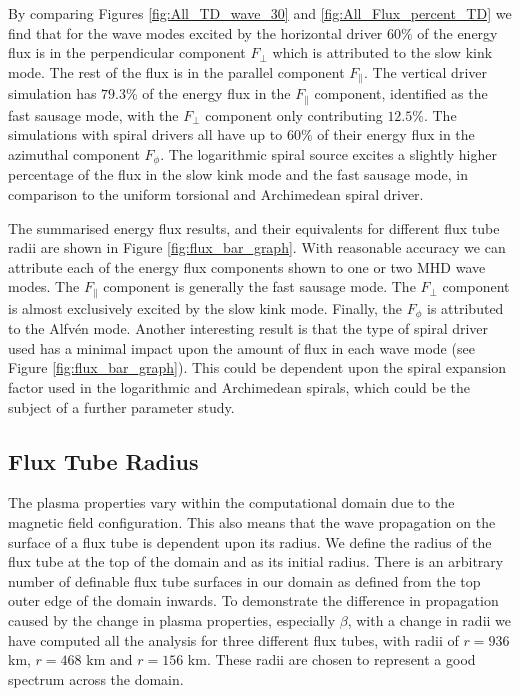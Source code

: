 By comparing Figures \ref{fig:All_TD_wave_30} and \ref{fig:All_Flux_percent_TD} we find that for the wave modes excited by the horizontal driver $60$\% of the energy flux is in the perpendicular component $F_\perp$ which is attributed to the slow kink mode.
 The rest of the flux is in the parallel component $F_\parallel$. 
 The vertical driver simulation has $79.3$\% of the energy flux in the $F_\parallel$ component, identified as the fast sausage mode, with the $F_\perp$ component only contributing $12.5$\%. 
 The simulations with spiral drivers all have up to $60$\% of their energy flux in the azimuthal component $F_\phi$. 
 The logarithmic spiral source excites a slightly higher percentage of the flux in the slow kink mode and the fast sausage mode, in comparison to the uniform torsional and Archimedean spiral driver.

The summarised energy flux results, and their equivalents for different flux tube radii are shown in Figure \ref{fig:flux_bar_graph}.
 With reasonable accuracy we can attribute each of the energy flux components shown to one or two MHD wave modes.
 The $F_\parallel$ component is generally the fast sausage mode. 
 The $F_\perp$ component is almost exclusively excited by the slow kink mode.
 Finally, the $F_\phi$ is attributed to the Alfv\'en mode.
 Another interesting result is that the type of spiral driver used has a minimal impact upon the amount of flux in each wave mode (see Figure \ref{fig:flux_bar_graph}).
 This could be dependent upon the spiral expansion factor used in the logarithmic and Archimedean spirals, which could be the subject of a further parameter study.

\subsection{Flux Tube Radius}
The plasma properties vary within the computational domain due to the magnetic field configuration.
 This also means that the wave propagation on the surface of a flux tube is dependent upon its radius. 
 We define the radius of the flux tube at the top of the domain and as its initial radius.
 There is an arbitrary number of definable flux tube surfaces in our domain as defined from the top outer edge of the domain inwards. 
 To demonstrate the difference in propagation caused by the change in plasma properties, especially $\beta$, with a change in radii we have computed all the analysis for three different flux tubes, with radii of $r=936$ km, $r=468$ km and  $r=156$ km. These radii are chosen to represent a good spectrum across the domain.


